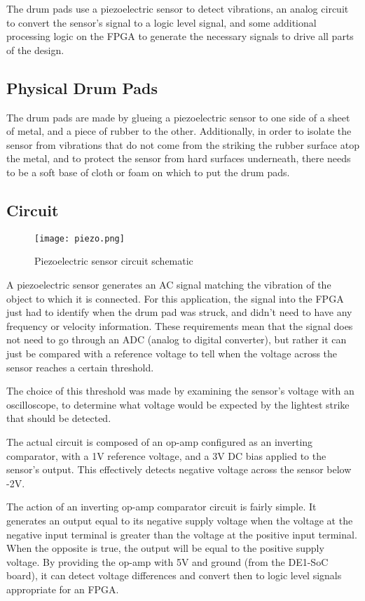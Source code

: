 \documentclass{subfile}
\begin{document}
  The drum pads use a piezoelectric sensor to detect vibrations, an analog circuit to 
  convert the sensor's signal to a logic level signal, and some additional processing 
  logic on the FPGA to generate the necessary signals to drive all parts of the 
  design. 

  \subsection{Physical Drum Pads} 
  The drum pads are made by glueing a piezoelectric sensor to one side of a sheet of 
  metal, and a piece of rubber to the other.
  Additionally, in order to isolate the sensor from vibrations that do not come from the 
  striking the rubber surface atop the metal, and to protect the sensor from hard surfaces 
  underneath,
  there needs to be a soft base of cloth or foam on which to put the drum pads.

  \subsection{Circuit} 
  \begin{figure}[h]
    \centering 
    \texttt{[image: piezo.png]}
    \caption{Piezoelectric sensor circuit schematic} 
    \label{fig:piezo_circuit}
  \end{figure}
  A piezoelectric sensor generates an AC signal matching the vibration of the object 
  to which it is connected.
  For this application, the signal into the FPGA just had to identify when 
  the drum pad was struck, and didn't need to have any frequency or velocity information. 
  These requirements mean that the signal does not need to go through an ADC (analog to 
  digital converter), but rather 
  it can just be compared with a reference voltage to tell when the voltage across the 
  sensor reaches a certain threshold.

  The choice of this threshold was made by examining the sensor's voltage with an 
  oscilloscope, to determine what voltage would be expected by the lightest strike that 
  should be detected.

  The actual circuit is composed of an op-amp configured as an inverting comparator, with a 
  1V reference voltage, and a 3V DC bias applied to the sensor's output. 
  This effectively detects negative voltage across the sensor below -2V.

  The action of an inverting op-amp comparator circuit is fairly simple. 
  It generates an output equal to its negative supply voltage when the voltage at 
  the negative input terminal is greater than the voltage at the positive input terminal.
  When the opposite is true, the output will be equal to the positive supply voltage. 
  By providing the op-amp with 5V and ground (from the DE1-SoC board), it can detect 
  voltage differences and convert then to logic level signals appropriate for an FPGA.
\end{document}
